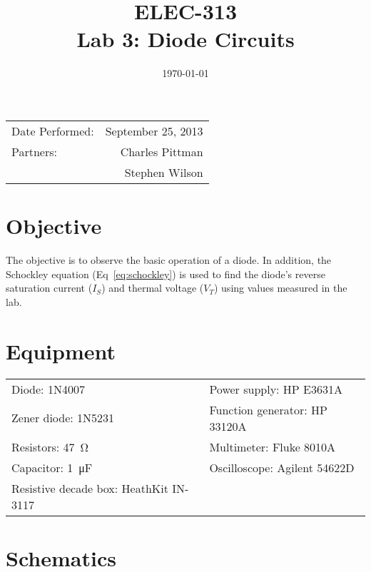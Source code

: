 \documentclass{article}
\author{}
\title{ELEC-313 \\ Lab 3: Diode Circuits\\ }
\date{\today}
\begin{document}
\maketitle

\begin{center}
  \begin{tabular}{lr}
    Date Performed: & September 25, 2013 \\
    Partners: & Charles Pittman \\
    & Stephen Wilson \\
  \end{tabular}
\end{center}

\newpage

\tableofcontents
\listoffigures
\listoftables

\newpage


\renewcommand{\labelenumi}{\alph{enumi}.}

\section{Objective}
\label{sec:objective}

The objective is to observe the basic operation of a diode.  In
addition, the Schockley equation (Eq~\ref{eq:schockley}) is used to
find the diode's reverse saturation current ($I_S$) and thermal
voltage ($V_T$) using values measured in the lab.

\section{Equipment}
\label{sec:equipment}

\begin{tabular}{ll}
  \centering
  Diode: 1N4007 & Power supply: HP E3631A \\
  Zener diode: 1N5231 & Function generator: HP 33120A \\
  Resistors: \SI{47}{\ohm} & Multimeter: Fluke 8010A \\
  Capacitor: \SI{1}{\micro\farad} & Oscilloscope: Agilent 54622D \\
  Resistive decade box: HeathKit IN-3117 \\
\end{tabular}

\section{Schematics}
\label{sec:schematics}
\end{document}
